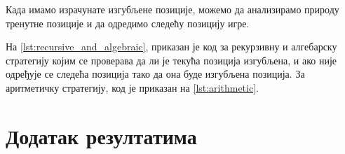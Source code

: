 \documentclass[a4paper]{article}
\begin{document}
Када имамо израчунате изгубљене позиције, можемо да анализирамо природу тренутне позиције и да одредимо следећу позицију игре.

На \ref{lst:recursive_and_algebraic}, приказан је код за рекурзивну и алгебарску стратегију којим се проверава да ли је текућа позиција изгубљена, и ако није одређује се следећа позиција тако да она буде изгубљена позиција.
За аритметичку стратегију, код је приказан на \ref{lst:arithmetic}.





\newpage
\appendix
\section{Додатак резултатима}



\newpage
{}
\appendix
 

\end{document}
